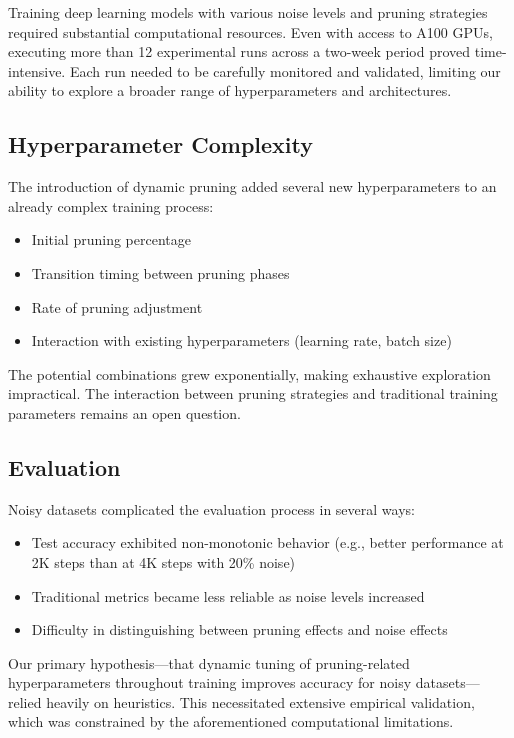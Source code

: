 \documentclass{article}
\begin{document}
Training deep learning models with various noise levels and pruning strategies required substantial computational resources. Even with access to A100 GPUs, executing more than 12 experimental runs across a two-week period proved time-intensive. Each run needed to be carefully monitored and validated, limiting our ability to explore a broader range of hyperparameters and architectures.

\subsection{Hyperparameter Complexity}

The introduction of dynamic pruning added several new hyperparameters to an already complex training process:

\begin{itemize}
    \item Initial pruning percentage
    \item Transition timing between pruning phases
    \item Rate of pruning adjustment
    \item Interaction with existing hyperparameters (learning rate, batch size)
\end{itemize}

The potential combinations grew exponentially, making exhaustive exploration impractical. The interaction between pruning strategies and traditional training parameters remains an open question.

\subsection{Evaluation}

Noisy datasets complicated the evaluation process in several ways:

\begin{itemize}
    \item Test accuracy exhibited non-monotonic behavior (e.g., better performance at 2K steps than at 4K steps with 20\% noise)
    \item Traditional metrics became less reliable as noise levels increased
    \item Difficulty in distinguishing between pruning effects and noise effects
\end{itemize}

Our primary hypothesis---that dynamic tuning of pruning-related hyperparameters throughout training improves accuracy for noisy datasets---relied heavily on heuristics. This necessitated extensive empirical validation, which was constrained by the aforementioned computational limitations.
\end{document}
